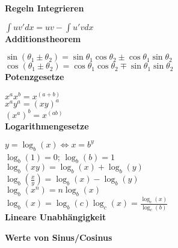 \documentclass[10pt,twocolumn,a4paper]{article}
\begin{document}
\begin{flushleft}
\textbf{Regeln Integrieren}

$\int {uv'} dx = uv - \int {u'v}dx$\\

\textbf{Additionstheorem}

$\sin \left( {\theta _1  \pm \theta _2 } \right) = \sin \theta _1 \cos \theta _2  \pm \cos \theta _1 \sin \theta _2$\\
$\cos \left( {\theta _1  \pm \theta _2 } \right) = \cos \theta _1 \cos \theta _2  \mp \sin \theta _1 \sin \theta _2$\\

\textbf{Potenzgesetze}

$x^a x^b  = x^{\left( {a + b} \right)}$\\
$x^a y^a  = \left( {xy} \right)^a$\\
$\left( {x^a } \right)^b  = x^{\left( {ab} \right)}$\\

\textbf{Logarithmengesetze}

$y = \log _b \left( x \right) \Leftrightarrow x = b^y$\\
$\log _b \left( 1 \right) = 0$; $\log _b \left( b \right) = 1$\\
$\log _b \left( {xy} \right) = \log _b \left( x \right) + \log _b \left( y \right)$\\
$\log _b \left( {\frac{x}{y}} \right) = \log _b \left( x \right) - \log _b \left( y \right)$\\
$\log _b \left( {x^n } \right) = n\log _b \left( x \right)$\\
$\log _b \left( x \right) = \log _b \left( c \right)\log _c \left( x \right) = \frac{{\log _c \left( x \right)}}{{\log _c \left( b \right)}}$\\

\textbf{Lineare Unabhängigkeit}

\textbf{Werte von Sinus/Cosinus}


\end{flushleft}
\end{document}
